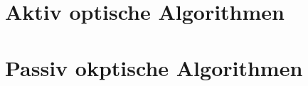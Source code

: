 \section{Aktiv optische Algorithmen}
\label{sec:kamera_basierte_he}

\section{Passiv okptische Algorithmen}
\label{sec:sensor_basierte_he}
